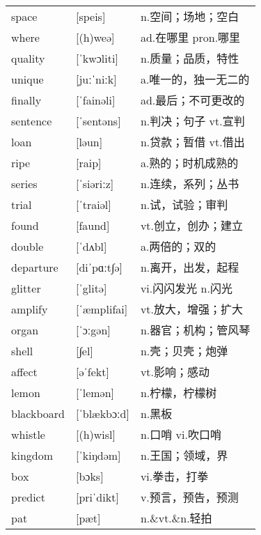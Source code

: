 \documentclass[a4paper]{article}
\begin{document}
\section{}
\begin{tabular}{l l l}

space & [speis] & n.空间；场地；空白 \\
where & [(h)weə] & ad.在哪里 pron.哪里 \\
quality & [ˈkwɔliti] & n.质量；品质，特性 \\
unique & [juːˈniːk] & a.唯一的，独一无二的 \\
finally & [ˈfainəli] & ad.最后；不可更改的 \\
sentence & [ˈsentəns] & n.判决；句子 vt.宣判 \\
loan & [ləun] & n.贷款；暂借 vt.借出 \\
ripe & [raip] & a.熟的；时机成熟的 \\
series & [ˈsiəriːz] & n.连续，系列；丛书 \\
trial & [ˈtraiəl] & n.试，试验；审判 \\
found & [faund] & vt.创立，创办；建立 \\
double & [ˈdʌbl] & a.两倍的；双的 \\
departure & [diˈpɑːt∫ə] & n.离开，出发，起程 \\
glitter & [ˈglitə] & vi.闪闪发光 n.闪光 \\
amplify & [ˈæmplifai] & vt.放大，增强；扩大 \\
organ & [ˈɔːgən] & n.器官；机构；管风琴 \\
shell & [∫el] & n.壳；贝壳；炮弹 \\
affect & [əˈfekt] & vt.影响；感动 \\
lemon & [ˈlemən] & n.柠檬，柠檬树 \\
blackboard & [ˈblækbɔːd] & n.黑板 \\
whistle & [(h)wisl] & n.口哨 vi.吹口哨 \\
kingdom & [ˈkiŋdəm] & n.王国；领域，界 \\
box & [bɔks] & vi.拳击，打拳 \\
predict & [priˈdikt] & v.预言，预告，预测 \\
pat & [pæt] & n.\&vt.\&n.轻拍 \\

\end{tabular}
\end{document}
